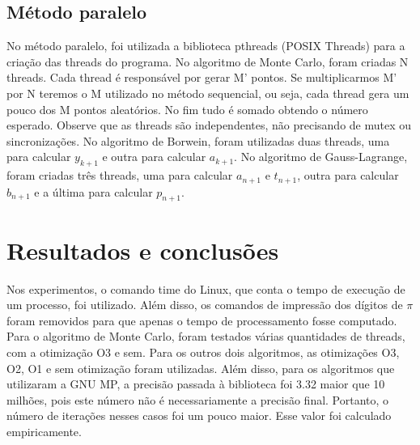 \documentclass[a4paper]{article}
\begin{document}
\subsection{Método paralelo}
No método paralelo, foi utilizada a biblioteca pthreads (POSIX Threads) para 
a criação das threads do programa. No algoritmo de Monte Carlo, foram criadas N threads. 
Cada thread é responsável por gerar M' pontos. Se multiplicarmos M' por N teremos 
o M utilizado no método sequencial, ou seja, cada thread gera um pouco dos M pontos aleatórios. 
No fim tudo é somado obtendo o número esperado. Observe que as threads são independentes, 
não precisando de mutex ou sincronizações. No algoritmo de Borwein, foram utilizadas duas threads, uma para 
calcular \begin{math}y_{k+1}\end{math} e outra para calcular \begin{math}a_{k+1}\end{math}.
No algoritmo de Gauss-Lagrange, foram criadas três threads, uma para calcular
\begin{math}a_{n+1}\end{math} e \begin{math}t_{n+1}\end{math}, outra para calcular \begin{math}b_{n+1}\end{math} e
a última para calcular \begin{math}p_{n+1}\end{math}.

\section{Resultados e conclusões}
Nos experimentos, o comando time do Linux, que conta o tempo de execução de um 
processo, foi utilizado. Além disso, os comandos de impressão dos dígitos de \begin{math}\pi\end{math} 
foram removidos para que apenas o tempo de processamento fosse computado. Para o
algoritmo de Monte Carlo, foram testados várias quantidades de threads, com a otimização
O3 e sem. Para os outros dois algoritmos, as otimizações O3, O2, O1 e sem otimização foram
utilizadas. Além disso, para os algoritmos que utilizaram a GNU MP, a precisão passada
à biblioteca foi 3.32 maior que 10 milhões, pois este número não é necessariamente a precisão final. 
Portanto, o número de iterações nesses casos foi um pouco maior. Esse valor foi calculado empiricamente.\\
\end{document}
